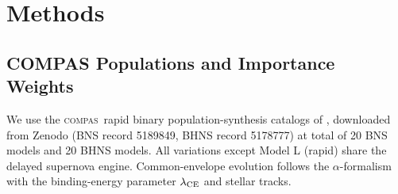 \documentclass[twocolumn,apj]{openjournal}
\newcommand{\compas}{\textsc{compas}}
\begin{document}
\section{Methods} \label{sec:methods}
\subsection{COMPAS Populations and Importance Weights} \label{sec:populations}

We use the \compas\ rapid binary population-synthesis catalogs of
\citet{broekgaarden2021,broekgaarden2022}, downloaded from Zenodo (BNS record 5189849, BHNS record 5178777) at total of 20 BNS models and 20 BHNS models. All variations except Model L (rapid) share the \citet{fryer2012} delayed supernova engine. Common-envelope evolution follows the \citet{webbink1984} $\alpha$-formalism with the \citet{xuli2010} binding-energy parameter $\lambda_{\rm CE}$ and
\citet{hurley2002} stellar tracks.
\end{document}
